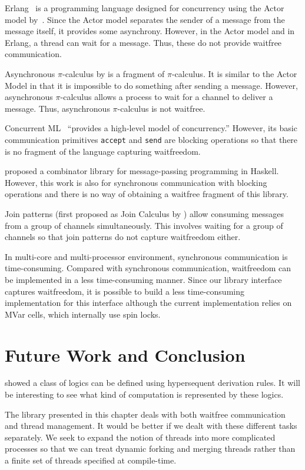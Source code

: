 Erlang~\citep{erlang} is a programming language designed for concurrency
using the Actor model by~\citet{actor}.
Since the Actor model separates the sender of a message from the message
itself, it provides some asynchrony.  However, in the Actor model and in
Erlang, a thread can wait for a message.  Thus, these do not provide
waitfree communication.


Asynchronous $\pi$-calculus by \citet{api} is a fragment of
$\pi$-calculus.  It is
similar to the Actor Model in that it is impossible to do something
after sending a message.  However, asynchronous $\pi$-calculus
allows a process to wait for a channel to deliver a message.  Thus,
asynchronous $\pi$-calculus is not waitfree.

Concurrent ML~\citep{concurrentML} ``provides a high-level model of
concurrency.''  However, its basic communication primitives
\texttt{accept} and \texttt{send} are blocking operations so that there
is no fragment of the language capturing waitfreedom.

\citet{Brown} proposed a combinator library for message-passing
programming in Haskell.  However, this work is also for synchronous
communication with blocking operations and there is no way of
obtaining a waitfree
fragment of this library.

Join patterns (first proposed as Join Calculus by \citet{join}) allow
consuming messages from a group of
channels simultaneously.  This involves waiting for a group of channels
so that join patterns do not capture waitfreedom either.

In multi-core and multi-processor environment, synchronous communication
is time-consuming.  Compared with
synchronous communication, waitfreedom can be implemented in a less
time-consuming manner.  Since our library
interface captures waitfreedom, it is possible to build a less
time-consuming implementation for this interface although the current
implementation relies on MVar cells, which internally use spin locks.

\section{Future Work and Conclusion}

\citet*{alg} showed a class of logics can be defined using
hypersequent derivation rules.  It will be interesting to see what kind
of computation is represented by these logics.

The library presented in this chapter deals with both waitfree
communication and thread management.  It would be better if we dealt with
these different tasks separately.
We seek to expand the notion of threads into more complicated
processes so that we can treat dynamic forking and merging threads rather
than a finite set of threads specified at compile-time.

